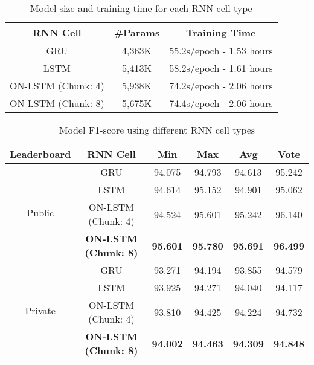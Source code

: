 \documentclass[11pt,a4paper]{article}
\begin{document}
\begin{table*}
\centering
\caption{Model size and training time for each RNN cell type}
\label{tab:p1_1}
\begin{tabular}{|c|c|c|}
\hline
RNN Cell               & \#Params & Training Time            \\ \hline
GRU                    & 4,363K   & 55.2s/epoch - 1.53 hours \\ \hline
LSTM                   & 5,413K   & 58.2s/epoch - 1.61 hours \\ \hline
ON-LSTM (Chunk: 4) & 5,938K   & 74.2s/epoch - 2.06 hours \\ \hline
ON-LSTM (Chunk: 8) & 5,675K   & 74.4s/epoch - 2.06 hours \\ \hline
\end{tabular}
\end{table*}

\begin{table*}
\centering
\caption{Model F1-score using different RNN cell types}
\label{tab:p1_2}
\begin{tabular}{|c|c|c|c|c|c|}
\hline
Leaderboard              & RNN Cell                                                              & Min             & Max             & Avg             & Vote            \\ \hline
\multirow{4}{*}{Public}  & GRU                                                                   & 94.075          & 94.793          & 94.613          & 95.242          \\ \cline{2-6} 
                         & LSTM                                                                  & 94.614          & 95.152          & 94.901          & 95.062          \\ \cline{2-6} 
                         & ON-LSTM (Chunk: 4)          & 94.524          & 95.601          & 95.242          & 96.140          \\ \cline{2-6} 
                         & \textbf{ON-LSTM (Chunk: 8)} & \textbf{95.601} & \textbf{95.780} & \textbf{95.691} & \textbf{96.499} \\ \hline
\multirow{4}{*}{Private} & GRU                                                                   & 93.271          & 94.194          & 93.855          & 94.579          \\ \cline{2-6} 
                         & LSTM                                                                  & 93.925          & 94.271          & 94.040          & 94.117          \\ \cline{2-6} 
                         & ON-LSTM (Chunk: 4)          & 93.810          & 94.425          & 94.224          & 94.732          \\ \cline{2-6} 
                         & \textbf{ON-LSTM (Chunk: 8)} & \textbf{94.002} & \textbf{94.463} & \textbf{94.309} & \textbf{94.848} \\ \hline
\end{tabular}
\end{table*}
\end{document}
